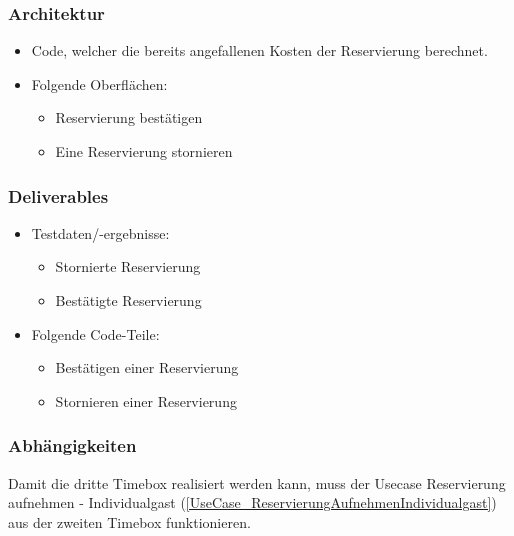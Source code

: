 \subsubsection{Architektur}
\begin{itemize}
	\item Code, welcher die bereits angefallenen Kosten der \Gls{Reservierung} berechnet.
	\item Folgende Oberflächen:
	\begin{itemize}
		\item \Gls{Reservierung} bestätigen
		\item Eine \Gls{Reservierung} stornieren
	\end{itemize}
\end{itemize}
\subsubsection{Deliverables}
\begin{itemize}
	\item Testdaten/-ergebnisse:
	\begin{itemize}
		\item Stornierte \Gls{Reservierung}
		\item Bestätigte \Gls{Reservierung}
	\end{itemize}
	\item Folgende Code-Teile:
	\begin{itemize}
		\item Bestätigen einer \Gls{Reservierung}
		\item Stornieren einer \Gls{Reservierung}
	\end{itemize}
\end{itemize}

\subsubsection{Abhängigkeiten}
Damit die dritte Timebox realisiert werden kann, muss der Usecase Reservierung aufnehmen - Individualgast (\ref{UseCase_ReservierungAufnehmenIndividualgast}) aus der zweiten Timebox funktionieren.
